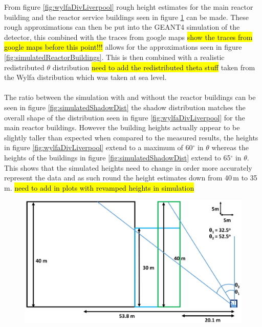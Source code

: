 From figure \ref{fig:wylfaDivLiverpool} rough height estimates for the main reactor building and the reactor service buildings seen in figure \ref{fig:wylfaHieghts} can be made. These rough approximations can then be put into the GEANT4 simulation of the detector, this combined with the traces from google maps \hl{show the traces from google maps before this point!!!} allows for the approximations seen in figure \ref{fig:simulatedReactorBuildings}. This is then combined with a realistic redistributed $\theta$ distribution \hl{need to add the redistributed theta stuff} taken from the Wylfa distribution which was taken at sea level. 
\\\\ The ratio between the simulation with and without the reactor buildings can be seen in figure \ref{fig:simulatedShadowDist} the shadow distribution matches the overall shape of the distribution seen in figure \ref{fig:wylfaDivLiverpool} for the main reactor buildings. However the building heights actually appear to be slightly taller than expected when compared to the measured results, the heights in figure \ref{fig:wylfaDivLiverpool} extend to a maximum of 60$^\circ$ in $\theta$ whereas the heights of the buildings in figure \ref{fig:simulatedShadowDist} extend to 65$^\circ$ in $\theta$. This shows that the simulated heights need to change in order more accurately represent the data and as such round the height estimates down from 40\,m to 35\,m. \hl{need to add in plots with revamped heights in simulation}

\begin{figure}[H]
 \centering
 \includegraphics[width=1.0\linewidth]{Chapter5/Figs/Raster/wyflaHieghtsNew.png}
 \label{fig:wylfaHieghts}
\end{figure}

